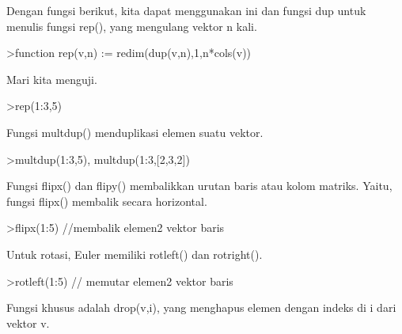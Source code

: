 \documentclass[a4paper,10pt]{article}
\begin{document}
\begin{eulernotebook}
\begin{eulercomment}
\begin{eulercomment}
\begin{eulercomment}
\begin{eulercomment}
\begin{eulercomment}
\begin{eulercomment}
\begin{eulercomment}
Dengan fungsi berikut, kita dapat menggunakan ini dan fungsi dup untuk
menulis fungsi rep(), yang mengulang vektor n kali.
\end{eulercomment}
\begin{eulerprompt}
>function rep(v,n) := redim(dup(v,n),1,n*cols(v))
\end{eulerprompt}
\begin{eulercomment}
Mari kita menguji.
\end{eulercomment}
\begin{eulerprompt}
>rep(1:3,5)
\end{eulerprompt}
\begin{euleroutput}
  [1,  2,  3,  1,  2,  3,  1,  2,  3,  1,  2,  3,  1,  2,  3]
\end{euleroutput}
\begin{eulercomment}
Fungsi multdup() menduplikasi elemen suatu vektor.
\end{eulercomment}
\begin{eulerprompt}
>multdup(1:3,5), multdup(1:3,[2,3,2])
\end{eulerprompt}
\begin{euleroutput}
  [1,  1,  1,  1,  1,  2,  2,  2,  2,  2,  3,  3,  3,  3,  3]
  [1,  1,  2,  2,  2,  3,  3]
\end{euleroutput}
\begin{eulercomment}
Fungsi flipx() dan flipy() membalikkan urutan baris atau kolom
matriks. Yaitu, fungsi flipx() membalik secara horizontal.
\end{eulercomment}
\begin{eulerprompt}
>flipx(1:5) //membalik elemen2 vektor baris
\end{eulerprompt}
\begin{euleroutput}
  [5,  4,  3,  2,  1]
\end{euleroutput}
\begin{eulercomment}
Untuk rotasi, Euler memiliki rotleft() dan rotright().
\end{eulercomment}
\begin{eulerprompt}
>rotleft(1:5) // memutar elemen2 vektor baris
\end{eulerprompt}
\begin{euleroutput}
  [2,  3,  4,  5,  1]
\end{euleroutput}
\begin{eulercomment}
Fungsi khusus adalah drop(v,i), yang menghapus elemen dengan indeks di
i dari vektor v.
\end{eulercomment}
\begin{eulerprompt}

\end{eulerprompt}
\end{eulercomment}
\end{eulercomment}
\end{eulercomment}
\end{eulercomment}
\end{eulercomment}
\end{eulercomment}
\end{eulernotebook}
\end{document}
